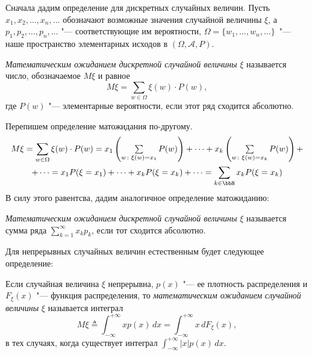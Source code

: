 Сначала дадим определение для дискретных случайных величин. Пусть $x_1,x_2,\dots,x_n,\dots$ обозначают возможные значения случайной величины $\xi$, а $p_1,p_2,\dots,p_n,\dots$ "--- соответствующие им вероятности, $\Omega = \{w_1,\dots, w_n,...\}$~"--- наше пространство элементарных исходов в $(\Omega,\mathcal A, P)$.
\begin{defn}\label{teorver1}
\textit{Математическим ожиданием дискретной случайной величины} $\xi$ называется число, обозначаемое $M\xi$ и равное
\begin{equation}
M\xi = \sum_{w \in \Omega} \xi(w)\cdot P(w),
\end{equation}
где $P(w)$ "--- элементарные вероятности, если этот ряд сходится абсолютно.
\end{defn}
Перепишем определение матожидания по-другому.
\begin{multline*}
M\xi=\sum_{w \in \Omega} \xi(w)\cdot P(w)=x_1\left(\textstyle\sum\limits_{w\colon \xi(w)=x_1} P(w)\right)+\dots+x_k\left(\textstyle\sum\limits_{w\colon \xi(w)=x_k} P(w)\right)+\\+\dots =x_1P(\xi=x_1)+\dots+ x_kP(\xi=x_k)+\dots=\sum_{k\in \bbN} x_kP(\xi=x_k)
\end{multline*}
В силу этого равентсва, дадим аналогичное определение матожиданию:
\begin{defnn}\label{teorver1s}
\textit{Математическим ожиданием дискретной случайной величины} $\xi$ называется сумма ряда $\sum\limits_{k=1}^{\infty}x_k p_k$, если тот сходится абсолютно.
\end{defnn}


Для непрерывных случайных величин естественным будет следующее определение: 
\begin{defn} 
Если случайная величина $\xi$ непрерывна, $p(x)$ "--- ее плотность распределения и $F_\xi(x)$ "--- функция распределения,  то \textit{математическим ожиданием} \textit{случайной величины} $\xi$ называется интеграл
\begin{equation}
M\xi\triangleq\int_{-\infty}^{+\infty} xp(x)\,dx = \int_{-\infty}^{+\infty} x\,dF_\xi(x),
\end{equation}
в тех случаях, когда существует интеграл $\int_{-\infty}^{+\infty} |x|p(x)\,dx.$ 
\end{defn}



